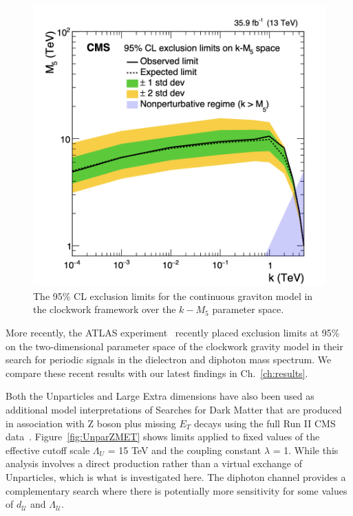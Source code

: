 \begin{figure}[ht]
    \centering
    \includegraphics[scale=0.5]{fig/ClockworkCMS.png}
    \caption{The 95\%  CL exclusion limits for the continuous graviton model in the clockwork framework over the $k -M_5$ parameter space.}
    \label{fig:ClockworkCMS2016}
\end{figure}


More recently, the ATLAS experiment~\cite{ATLAS:2023hbp} recently placed exclusion limits at 95\% on the two-dimensional parameter space of the clockwork gravity model in their search for periodic signals in the dielectron and diphoton mass spectrum. We compare these recent results with our latest findings in Ch.~\ref{ch:results}.


Both the Unparticles and Large Extra dimensions have also been used as additional model interpretations of Searches for Dark Matter that are produced in association with Z boson plus missing $E_{T}$ decays using the full Run II CMS data~\cite{CMS:2020ulv}. Figure~\ref{fig:UnparZMET} shows limits applied to fixed values of the effective cutoff scale $\Lambda_U$ = 15 TeV and the coupling constant $\lambda$ = 1. While this analysis involves a direct production rather than a virtual exchange of Unparticles, which is what is investigated here. The diphoton channel provides a complementary search where there is potentially more sensitivity for some values of $d_{\mathcal{U}}$ and $\Lambda_{\mathcal{U}}$.


